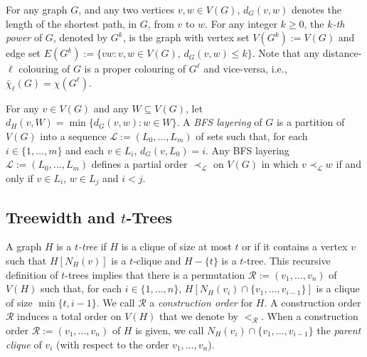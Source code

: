 \documentclass[kpfonts]{patmorin}
\newcommand{\dlcn}{\bar{\chi}_\ell}
\theoremstyle{named}
\begin{document}
For any graph $G$, and any two vertices $v,w\in V(G)$, $d_G(v,w)$ denotes the length of the shortest path, in $G$, from $v$ to $w$. For any integer $k\ge 0$, the \emph{$k$-th power} of $G$, denoted by $G^k$, is the graph with vertex set $V(G^k):=V(G)$ and edge set $E(G^{k}):=\{vw:v,w\in V(G),\,d_G(v,w)\le k\}$.
Note that any distance-$\ell$ colouring of $G$ is a proper colouring of $G^\ell$ and vice-versa, i.e., $\dlcn(G)=\chi(G^\ell)$.

For any $v\in V(G)$ and any $W\subseteq V(G)$, let $d_H(v,W)=\min\{d_G(v,w):w\in W\}$. A \emph{BFS layering} of $G$ is a partition of $V(G)$ into a sequence $\mathcal{L}:=(L_0,\ldots,L_m)$ of sets such that, for each $i\in\{1,\ldots,m\}$ and each $v\in L_i$, $d_G(v,L_0)=i$.  Any BFS layering $\mathcal{L}:=(L_0,\ldots,L_m)$ defines a partial order $\prec_{\mathcal{L}}$ on $V(G)$ in which $v\prec_{\mathcal{L}} w$ if and only if $v\in L_i$, $w\in L_j$ and $i<j$.




\subsection{Treewidth and $t$-Trees}

A graph $H$ is a \emph{$t$-tree} if $H$ is a clique of size at most $t$ or if it contains a vertex $v$ such that $H[N_H(v)]$ is a $t$-clique and $H-\{t\}$ is a $t$-tree.
This recursive definition of $t$-trees implies that there is a permutation $\mathcal{R}:=(v_1,\ldots,v_n)$ of $V(H)$ such that, for each $i\in\{1,\ldots,n\}$, $H[N_H(v_i)\cap \{v_1,\ldots,v_{i-1}\}]$ is a clique of size $\min\{t,i-1\}$.  We call $\mathcal{R}$ a \emph{construction order} for $H$.  A construction order $\mathcal{R}$ induces a total order on $V(H)$ that we denote by $<_{\mathcal{R}}$.  When a construction order $\mathcal{R}:=(v_1,\ldots,v_n)$ of $H$ is given, we call $N_H(v_i)\cap \{v_1,\ldots,v_{i-1}\}$ the \emph{parent clique} of $v_i$ (with respect to the order $v_1,\ldots,v_n$).
\end{document}
